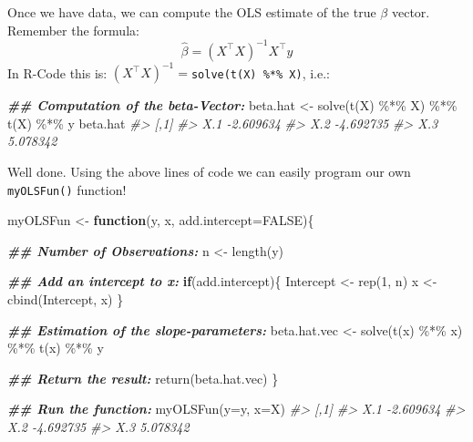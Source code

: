 \documentclass[
  14pt,
]{memoir}
\newenvironment{Shaded}{\begin{snugshade}}{\end{snugshade}}
\newcommand{\AttributeTok}[1]{\textcolor[rgb]{0.77,0.63,0.00}{#1}}
\newcommand{\CommentTok}[1]{\textcolor[rgb]{0.56,0.35,0.01}{\textit{#1}}}
\newcommand{\ConstantTok}[1]{\textcolor[rgb]{0.00,0.00,0.00}{#1}}
\newcommand{\ControlFlowTok}[1]{\textcolor[rgb]{0.13,0.29,0.53}{\textbf{#1}}}
\newcommand{\DecValTok}[1]{\textcolor[rgb]{0.00,0.00,0.81}{#1}}
\newcommand{\DocumentationTok}[1]{\textcolor[rgb]{0.56,0.35,0.01}{\textbf{\textit{#1}}}}
\newcommand{\FunctionTok}[1]{\textcolor[rgb]{0.00,0.00,0.00}{#1}}
\newcommand{\NormalTok}[1]{#1}
\newcommand{\OtherTok}[1]{\textcolor[rgb]{0.56,0.35,0.01}{#1}}
\newcommand{\SpecialCharTok}[1]{\textcolor[rgb]{0.00,0.00,0.00}{#1}}
\begin{document}
\hfill\break

Once we have data, we can compute the OLS estimate of the true \(\beta\) vector. Remember the formula:
\[\hat{\beta}=(X^\top X)^{-1}X^\top y\]
In R-Code this is: \((X^\top X)^{-1}=\)\texttt{solve(t(X)\ \%*\%\ X)}, i.e.:

\begin{Shaded}
\begin{Highlighting}[]
\DocumentationTok{\#\# Computation of the beta{-}Vector:}
\NormalTok{beta.hat }\OtherTok{\textless{}{-}} \FunctionTok{solve}\NormalTok{(}\FunctionTok{t}\NormalTok{(X) }\SpecialCharTok{\%*\%}\NormalTok{ X) }\SpecialCharTok{\%*\%} \FunctionTok{t}\NormalTok{(X) }\SpecialCharTok{\%*\%}\NormalTok{ y}
\NormalTok{beta.hat}
\CommentTok{\#\textgreater{}          [,1]}
\CommentTok{\#\textgreater{} X.1 {-}2.609634}
\CommentTok{\#\textgreater{} X.2 {-}4.692735}
\CommentTok{\#\textgreater{} X.3  5.078342}
\end{Highlighting}
\end{Shaded}

\hfill\break

Well done. Using the above lines of code we can easily program our own \texttt{myOLSFun()} function!

\begin{Shaded}
\begin{Highlighting}[]
\NormalTok{myOLSFun }\OtherTok{\textless{}{-}} \ControlFlowTok{function}\NormalTok{(y, x, }\AttributeTok{add.intercept=}\ConstantTok{FALSE}\NormalTok{)\{}
  
  \DocumentationTok{\#\# Number of Observations:}
\NormalTok{  n         }\OtherTok{\textless{}{-}} \FunctionTok{length}\NormalTok{(y)}
  
  \DocumentationTok{\#\# Add an intercept to x:}
  \ControlFlowTok{if}\NormalTok{(add.intercept)\{}
\NormalTok{    Intercept }\OtherTok{\textless{}{-}} \FunctionTok{rep}\NormalTok{(}\DecValTok{1}\NormalTok{, n)}
\NormalTok{    x         }\OtherTok{\textless{}{-}} \FunctionTok{cbind}\NormalTok{(Intercept, x)}
\NormalTok{  \}}
  
  \DocumentationTok{\#\# Estimation of the slope{-}parameters:}
\NormalTok{  beta.hat.vec }\OtherTok{\textless{}{-}} \FunctionTok{solve}\NormalTok{(}\FunctionTok{t}\NormalTok{(x) }\SpecialCharTok{\%*\%}\NormalTok{ x) }\SpecialCharTok{\%*\%} \FunctionTok{t}\NormalTok{(x) }\SpecialCharTok{\%*\%}\NormalTok{ y}
  
  \DocumentationTok{\#\# Return the result:}
  \FunctionTok{return}\NormalTok{(beta.hat.vec)}
\NormalTok{\}}

\DocumentationTok{\#\# Run the function:}
\FunctionTok{myOLSFun}\NormalTok{(}\AttributeTok{y=}\NormalTok{y, }\AttributeTok{x=}\NormalTok{X)}
\CommentTok{\#\textgreater{}          [,1]}
\CommentTok{\#\textgreater{} X.1 {-}2.609634}
\CommentTok{\#\textgreater{} X.2 {-}4.692735}
\CommentTok{\#\textgreater{} X.3  5.078342}
\end{Highlighting}
\end{Shaded}
\end{document}
